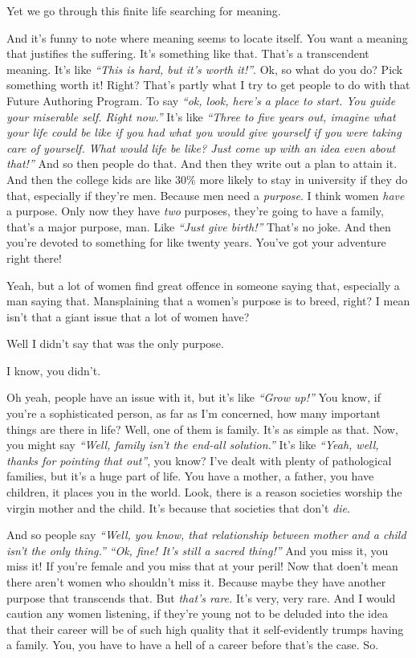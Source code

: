 \documentclass{memoir}
\newcommand{\qq}[1]{\emph{“#1”}}
\begin{document}
\begin{drama}
		\jrspeaks Yet we go through this finite life searching for meaning.

		\jpspeaks And it's funny to note where meaning seems to locate itself. You want a meaning that justifies the suffering. It's something like that. That's a transcendent meaning. It's like \qq{This is hard, but it's worth it!}. Ok, so what do you do? Pick something worth it! Right? That's partly what I try to get people to do with that Future Authoring Program. To say \qq{ok, look, here's a place to start. You guide your miserable self. Right now.} It's like \qq{Three to five years out, imagine what your life could be like if you had what you would give yourself if you were taking care of yourself. What would life be like? Just come up with an idea even about that!} And so then people do that. And then they write out a plan to attain it. And then the college kids are like 30\% more likely to stay in university if they do that, especially if they're men. Because men need a \emph{purpose}. I think women \emph{have} a purpose. Only now they have \emph{two} purposes, they're going to have a family, that's a major purpose, man. Like \qq{Just give birth!} That's no joke. And then you're devoted to something for like twenty years. You've got your adventure right there!

		\jrspeaks Yeah, but a lot of women find great offence in someone saying that, especially a man saying that. Mansplaining that a women's purpose is to breed, right? I mean isn't that a giant issue that a lot of women have?

		\jpspeaks Well I didn't say that was the only purpose.

		\jrspeaks I know, you didn't.

		\jpspeaks Oh yeah, people have an issue with it, but it's like \qq{Grow up!} You know, if you're a sophisticated person, as far as I'm concerned, how many important things are there in life? Well, one of them is family. It's as simple as that. Now, you might say \qq{Well, family isn't the end-all solution.} It's like \qq{Yeah, well, thanks for pointing that out}, you know? I've dealt with plenty of pathological families, but it's a huge part of life. You have a mother, a father, you have children, it places you in the world. Look, there is a reason societies worship the virgin mother and the child. It's because that societies that don't \emph{die}.

		And so people say \qq{Well, you know, that relationship between mother and a child isn't the only thing.} \qq{Ok, fine! It's still a sacred thing!} And you miss it, you miss it! If you're female and you miss that at your peril! Now that doen't mean there aren't women who shouldn't miss it. Because maybe they have another purpose that transcends that. But \emph{that's rare.} It's very, very rare. And I would caution any women listening, if they're young not to be deluded into the idea that their career will be of such high quality that it self-evidently trumps having a family. You, you have to have a hell of a career before that's the case. So.


\end{drama}
\end{document}
